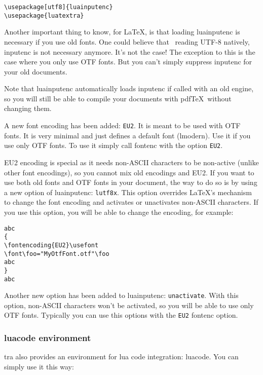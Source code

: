\documentclass{article}
\begin{document}
\begin{verbatim}
\usepackage[utf8]{luainputenc}
\usepackage{luatextra}
\end{verbatim}

Another important thing to know, for \LaTeX , is that loading \textsf{luainputenc} is necessary if you use old fonts. One could believe that \LuaTeX\ reading UTF-8 natively, \textsf{inputenc} is not necessary anymore. It's not the case! The exception to this is the case where you only use OTF fonts. But you can't simply suppress \textsf{inputenc} for your old documents.

Note that \textsf{luainputenc} automatically loads \textsf{inputenc} if called with an old engine, so you will still be able to compile your documents with pdf\TeX\ without changing them.

A new font encoding has been added: \texttt{EU2}. It is meant to be used with OTF fonts. It is very minimal and just defines a default font (lmodern). Use it if you use only OTF fonts. To use it simply call \textsf{fontenc} with the option \texttt{EU2}. 

EU2 encoding is special as it needs non-ASCII characters to be non-active (unlike other font encodings), so you cannot mix old encodings and EU2. If you want to use both old fonts and OTF fonts in your document, the way to do so is by using a new option of \textsf{luainputenc}: \texttt{lutf8x}. This option overrides \LaTeX 's mechanism to change the font encoding and activates or unactivates non-ASCII characters. If you use this option, you will be able to change the encoding, for example:

\begin{verbatim}
abc
{
\fontencoding{EU2}\usefont
\font\foo="MyOtfFont.otf"\foo
abc
}
abc
\end{verbatim} 

Another new option has been added to \textsf{luainputenc}: \texttt{unactivate}. With this option, non-ASCII characters won't be activated, so you will be able to use only OTF fonts. Typically you can use this options with the \texttt{EU2} \textsf{fontenc} option.

\subsubsection{luacode environment}

\LuaTeX tra also provides an environment for lua code integration: \textsf{luacode}. You can simply use it this way:
\end{document}

